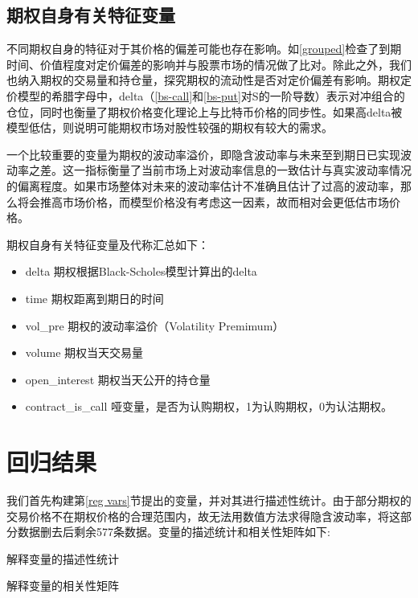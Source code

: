 {\subsection{期权自身有关特征变量}
\par{不同期权自身的特征对于其价格的偏差可能也存在影响。如\ref{grouped}检查了到期时间、价值程度对定价偏差的影响并与股票市场的情况做了比对。除此之外，我们也纳入期权的交易量和持仓量，探究期权的流动性是否对定价偏差有影响。期权定价模型的希腊字母中，delta（\ref{bs-call}和\ref{bs-put}对S的一阶导数）表示对冲组合的仓位，同时也衡量了期权价格变化理论上与比特币价格的同步性。如果高delta被模型低估，则说明可能期权市场对股性较强的期权有较大的需求。}
\par{
    一个比较重要的变量为期权的波动率溢价，即隐含波动率与未来至到期日已实现波动率之差。这一指标衡量了当前市场上对波动率信息的一致估计与真实波动率情况的偏离程度。如果市场整体对未来的波动率估计不准确且估计了过高的波动率，那么将会推高市场价格，而模型价格没有考虑这一因素，故而相对会更低估市场价格。
}
\par{
    期权自身有关特征变量及代称汇总如下：
}
\begin{itemize}
\item delta 期权根据Black-Scholes模型计算出的delta
\item time 期权距离到期日的时间
\item vol\_pre 期权的波动率溢价（Volatility Premimum）
\item volume 期权当天交易量                                     
\item open\_interest 期权当天公开的持仓量 
\item contract\_is\_call 哑变量，是否为认购期权，1为认购期权，0为认沽期权。 
\end{itemize}

\section{回归结果}  
我们首先构建第\ref{reg vars}节提出的变量，并对其进行描述性统计。由于部分期权的交易价格不在期权价格的合理范围内，故无法用数值方法求得隐含波动率，将这部分数据删去后剩余577条数据。变量的描述统计和相关性矩阵如下:
\newpage
{}
\begin{landscape} 
\begin{table}[H]
\caption{解释变量的描述性统计}
\resizebox{\linewidth}{!}{

}
\end{table}
\begin{table}[H]
\caption{解释变量的相关性矩阵}
\resizebox{\linewidth}{!}{    }
\end{table}    
\end{landscape}

}
